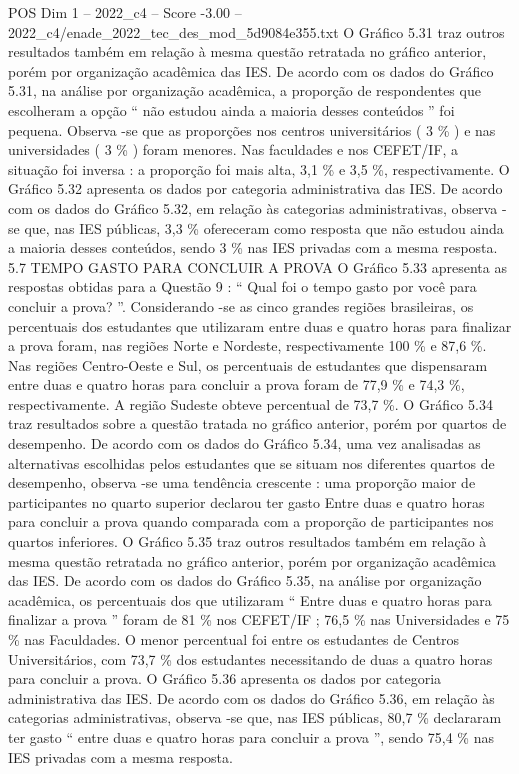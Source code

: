 \begin{textsample}{POS Dim 1 – 2022\_c4 – Score -3.00 – 2022\_c4/enade\_2022\_tec\_des\_mod\_5d9084e355.txt}
O Gráfico 5.31 traz outros resultados também em relação à mesma questão retratada no gráfico anterior, porém por organização acadêmica das IES.
De acordo com os dados do Gráfico 5.31, na análise por organização acadêmica, a proporção de respondentes que escolheram a opção “ não estudou ainda a maioria desses conteúdos ” foi pequena.
Observa -se que as proporções nos centros universitários ( 3 \% ) e nas universidades ( 3 \% ) foram menores.
Nas faculdades e nos CEFET/IF, a situação foi inversa : a proporção foi mais alta, 3,1 \% e 3,5 \%, respectivamente.
O Gráfico 5.32 apresenta os dados por categoria administrativa das IES.
De acordo com os dados do Gráfico 5.32, em relação às categorias administrativas, observa -se que, nas IES públicas, 3,3 \% ofereceram como resposta que não estudou ainda a maioria desses conteúdos, sendo 3 \% nas IES privadas com a mesma resposta. 5.7 TEMPO GASTO PARA CONCLUIR A PROVA O Gráfico 5.33 apresenta as respostas obtidas para a Questão 9 : “ Qual foi o tempo gasto por você para concluir a prova? ”.
Considerando -se as cinco grandes regiões brasileiras, os percentuais dos estudantes que utilizaram entre duas e quatro horas para finalizar a prova foram, nas regiões Norte e Nordeste, respectivamente 100 \% e 87,6 \%.
Nas regiões Centro-Oeste e Sul, os percentuais de estudantes que dispensaram entre duas e quatro horas para concluir a prova foram de 77,9 \% e 74,3 \%, respectivamente.
A região Sudeste obteve percentual de 73,7 \%.
O Gráfico 5.34 traz resultados sobre a questão tratada no gráfico anterior, porém por quartos de desempenho.
De acordo com os dados do Gráfico 5.34, uma vez analisadas as alternativas escolhidas pelos estudantes que se situam nos diferentes quartos de desempenho, observa -se uma tendência crescente : uma proporção maior de participantes no quarto superior declarou ter gasto Entre duas e quatro horas para concluir a prova quando comparada com a proporção de participantes nos quartos inferiores.
O Gráfico 5.35 traz outros resultados também em relação à mesma questão retratada no gráfico anterior, porém por organização acadêmica das IES.
De acordo com os dados do Gráfico 5.35, na análise por organização acadêmica, os percentuais dos que utilizaram “ Entre duas e quatro horas para finalizar a prova ” foram de 81 \% nos CEFET/IF ; 76,5 \% nas Universidades e 75 \% nas Faculdades.
O menor percentual foi entre os estudantes de Centros Universitários, com 73,7 \% dos estudantes necessitando de duas a quatro horas para concluir a prova.
O Gráfico 5.36 apresenta os dados por categoria administrativa das IES.
De acordo com os dados do Gráfico 5.36, em relação às categorias administrativas, observa -se que, nas IES públicas, 80,7 \% declararam ter gasto “ entre duas e quatro horas para concluir a prova ”, sendo 75,4 \% nas IES privadas com a mesma resposta.

\end{textsample}
